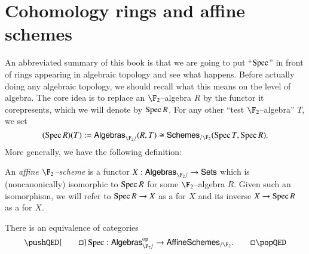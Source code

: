 \section{Cohomology rings and affine schemes}\label{SectionSchemesOverF2}

An abbreviated summary of this book is that we are going to put ``$\operatorname{Spec}$'' in front of rings appearing in algebraic topology and see what happens.  Before actually doing any algebraic topology, we should recall what this means on the level of algebra.  The core idea is to replace an $\F_2$--algebra $R$ by the functor it corepresents, which we will denote by $\operatorname{Spec} R$.  For any other ``test $\F_2$--algebra'' $T$, we set \[(\Spec R)(T) := \CatOf{Algebras}_{\F_2/}(R, T) \cong \CatOf{Schemes}_{/\F_2}(\Spec T, \Spec R).\]  More generally, we have the following definition:
\begin{definition}\label{DefnAffineF2Scheme}
An \textit{affine $\F_2$--scheme} is a functor $X: \CatOf{Algebras}_{\F_2/} \to \CatOf{Sets}$ which is (noncanonically) isomorphic to $\operatorname{Spec} R$ for some $\F_2$--algebra $R$.  Given such an isomorphism, we will refer to $\operatorname{Spec} R \to X$ as a  for $X$ and its inverse $X \to \operatorname{Spec} R$ as a  for $X$.
\end{definition}

\begin{lemma}
There is an equivalence of categories
\[
\pushQED{\qed}
\Spec: \CatOf{Algebras}_{\F_2/}^{\mathrm{op}} \to \CatOf{AffineSchemes}_{/\F_2}.\qedhere
\popQED
\]
\end{lemma}

